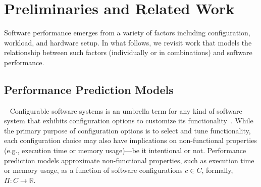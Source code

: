 \section{Preliminaries and Related Work}
{
Software performance emerges from a variety of factors including configuration, workload, and hardware setup. In what follows, we revisit work that models the relationship between  such factors (individually or in combinations) and software performance.

}
\subsection{Performance Prediction Models}~\label{sec:perfmodels}
Configurable software systems is an umbrella term for any kind of software system that exhibits configuration options to customize its functionality~\cite{apel2016feature}. While the primary purpose of configuration options is to select and tune functionality, each configuration choice may also have implications on non-functional properties (e.g., execution time or memory usage)---be it intentional or not. 
Performance prediction models approximate non-functional properties, such as execution time or memory usage, as a function of software configurations $c \in C$, formally, $\Pi: C \rightarrow \mathbb{R}$. 



